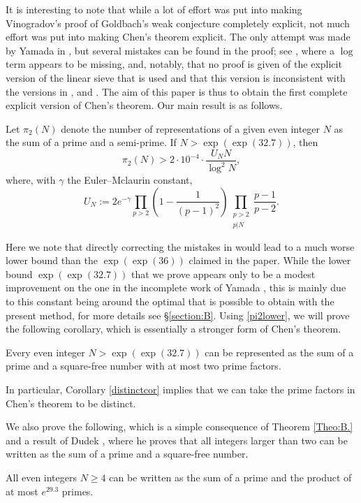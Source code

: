 \documentclass[12pt]{amsart}
\begin{document}
It is interesting to note that while a lot of effort was put into making Vinogradov's proof of Goldbach's weak conjecture completely explicit, not much effort was put into making Chen's theorem explicit. The only attempt was made by Yamada in \cite{Yamada1}, but several mistakes can be found in the proof; see \cite[(87) \& (104)]{Yamada1}, where a $\log $ term appears to be missing, and, notably, that no proof is given of the explicit version of the linear sieve that is used and that this version is inconsistent with the versions in \cite{JR},  \cite{Iwaniec} and \cite{Nathanson}. The aim of this paper is thus to obtain the first complete explicit version of Chen's theorem. Our main result is as follows.
\begin{theorem}
\label{Theo:B.}
Let $\pi_2(N)$ denote the number of representations of a given even integer $N$ as the sum of a prime and a semi-prime. If $N> \exp (\exp (32.7))$, then
\begin{equation}\label{pi2lower}
    \pi_2(N)> 2\cdot 10^{-4}\cdot\frac{U_N N}{\log^2N},
\end{equation}
where, with $\gamma$ the Euler--Mclaurin constant,
\begin{equation}
U_N:=2 e^{-\gamma}\prod_{p>2}\left( 1-\frac{1}{(p-1)^2}\right)\prod_{\substack{p>2\\p|N}}\frac{p-1}{p-2}.\label{UNeq}
\end{equation}
\end{theorem}
Here we note that directly correcting the mistakes in \cite{Yamada1} would lead to a much worse lower bound than the $\exp (\exp (36))$ claimed in the paper.  While the lower bound $\exp (\exp (32.7))$ that we prove appears only to be a modest improvement on the one in the incomplete work of Yamada \cite{Yamada1}, this is mainly due to this constant being around the optimal that is possible to obtain with the present method, for more details see \S \ref{section:B}.  \newline
Using \eqref{pi2lower}, we will prove the following corollary, which is essentially a stronger form of Chen's theorem.
\begin{corollary}\label{distinctcor}
    Every even integer $N>\exp(\exp(32.7))$ can be represented as the sum of a prime and a square-free number with at most two prime factors.
\end{corollary}
In particular, Corollary \ref{distinctcor} implies that we can take the prime factors in Chen's theorem to be distinct. 

We also prove the following, which is a simple consequence of Theorem \ref{Theo:B.} and a result of Dudek \cite{Dudek1}, where he proves that all integers larger than two can be written as the sum of a prime and a square-free number.
\begin{theorem}
\label{Theo:B1.}
All even integers $N\ge 4$ can be written as the sum of a prime and the product of at most $e^{29.3}$ primes.
\end{theorem}
\end{document}
